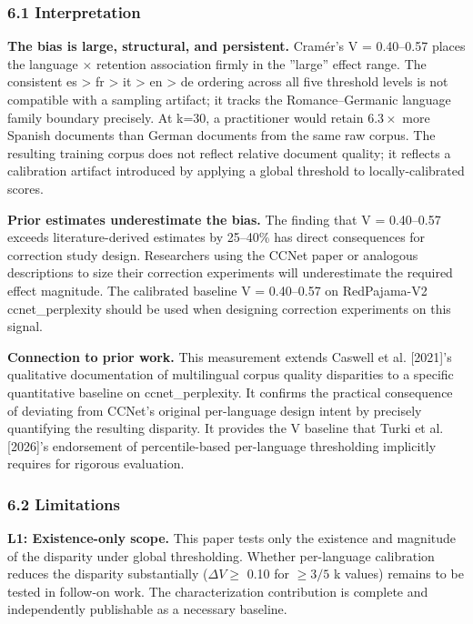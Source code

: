
\subsubsection{6.1 Interpretation}

\textbf{The bias is large, structural, and persistent.} Cramér's V = 0.40--0.57 places the language $\times$ retention association firmly in the ''large'' effect range. The consistent es > fr > it > en > de ordering across all five threshold levels is not compatible with a sampling artifact; it tracks the Romance--Germanic language family boundary precisely. At k=30, a practitioner would retain 6.$3\times$ more Spanish documents than German documents from the same raw corpus. The resulting training corpus does not reflect relative document quality; it reflects a calibration artifact introduced by applying a global threshold to locally-calibrated scores.

\textbf{Prior estimates underestimate the bias.} The finding that V = 0.40--0.57 exceeds literature-derived estimates by 25--40\% has direct consequences for correction study design. Researchers using the CCNet paper or analogous descriptions to size their correction experiments will underestimate the required effect magnitude. The calibrated baseline V = 0.40--0.57 on RedPajama-V2 ccnet\_perplexity should be used when designing correction experiments on this signal.

\textbf{Connection to prior work.} This measurement extends Caswell et al. [2021]'s qualitative documentation of multilingual corpus quality disparities to a specific quantitative baseline on ccnet\_perplexity. It confirms the practical consequence of deviating from CCNet's original per-language design intent \citep{Wenzek2019CCNet} by precisely quantifying the resulting disparity. It provides the V baseline that Turki et al. [2026]'s endorsement of percentile-based per-language thresholding implicitly requires for rigorous evaluation.

\subsubsection{6.2 Limitations}

\textbf{L1: Existence-only scope.} This paper tests only the existence and magnitude of the disparity under global thresholding. Whether per-language calibration reduces the disparity substantially ($\Delta V \geq$ 0.10 for $\geq 3/5$ k values) remains to be tested in follow-on work. The characterization contribution is complete and independently publishable as a necessary baseline.

